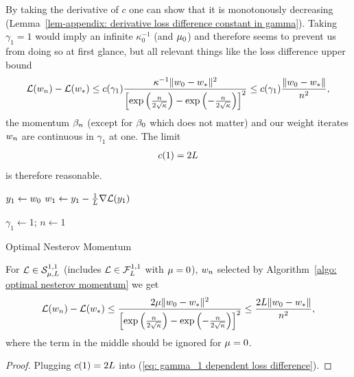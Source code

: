 By taking the derivative of \(c\) one can show that it is monotonously
decreasing (Lemma~\ref{lem-appendix: derivative loss difference constant in
gamma}). Taking \(\gamma_1=1\) would imply an infinite
\(\kappa_0^{-1}\) (and \(\mu_0\)) and therefore seems to prevent us from
doing so at first glance, but all relevant things like the loss difference upper
bound
\begin{align}\label{eq: gamma_1 dependent loss difference}
	\mathcal{L}(w_n)-\mathcal{L}(w_*)
	\le c(\gamma_1)
	\frac{\kappa^{-1}\|w_0-w_*\|^2}{\left[
		\exp\left(\frac{n}{2\sqrt{\kappa}}\right)
		-\exp\left(-\frac{n}{2\sqrt{\kappa}}\right)
	\right]^2}
	\le c(\gamma_1)\frac{\|w_0-w_*\|}{n^2},
\end{align}
the momentum \(\beta_n\) (except for \(\beta_0\) which does not
matter) and our weight iterates \(w_n\) are continuous in \(\gamma_1\) at
one. The limit
\begin{align*}
	c(1)=2L
\end{align*}
is therefore reasonable.

\begin{algorithm}
	\(y_1 \leftarrow w_0\)\;
	\(w_1 \leftarrow y_1 - \tfrac{1}{L}\nabla\mathcal{L}(y_1)\)\;

	\(\gamma_1 \leftarrow 1\); \(n\leftarrow 1\)\;
	\caption{Optimal Nesterov Momentum\label{algo: optimal nesterov momentum}}
\end{algorithm}
\begin{corollary}
	For \(\mathcal{L} \in \mathcal{S}^{1,1}_{{\mu},{L}}\) (includes
	\(\mathcal{L}\in\mathcal{F}^{1,1}_{L}\) with \(\mu=0\)), \(w_n\)
	selected by Algorithm~\ref{algo: optimal nesterov momentum}
	we get
	\begin{align*}
		\mathcal{L}(w_n)-\mathcal{L}(w_*)
		\le
		\frac{2\mu\|w_0-w_*\|^2}{\left[
			\exp\left(\frac{n}{2\sqrt{\kappa}}\right)
			-\exp\left(-\frac{n}{2\sqrt{\kappa}}\right)
		\right]^2}
		\le\frac{2L\|w_0-w_*\|}{n^2},
	\end{align*}
	where the term in the middle should be ignored for \(\mu=0\).
\end{corollary}
\begin{proof}
	Plugging \(c(1)=2L\) into (\ref{eq: gamma_1 dependent loss difference}).
\end{proof}

